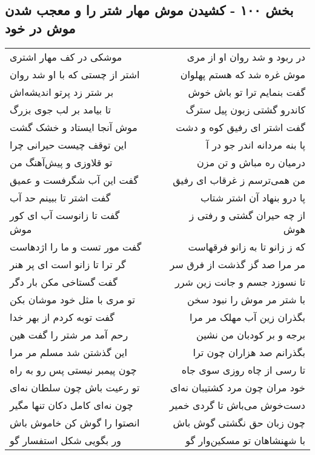 \begin{center}
\section*{بخش ۱۰۰ - کشیدن موش مهار شتر را و معجب  شدن موش در خود}
\label{sec:sh100}
\begin{longtable}{l p{0.5cm} r}
موشکی در کف مهار اشتری
&&
در ربود و شد روان او از مری
\\
اشتر از چستی که با او شد روان
&&
موش غره شد که هستم پهلوان
\\
بر شتر زد پرتو اندیشه‌اش
&&
گفت بنمایم ترا تو باش خوش
\\
تا بیامد بر لب جوی بزرگ
&&
کاندرو گشتی زبون پیل سترگ
\\
موش آنجا ایستاد و خشک گشت
&&
گفت اشتر ای رفیق کوه و دشت
\\
این توقف چیست حیرانی چرا
&&
پا بنه مردانه اندر جو در آ
\\
تو قلاوزی و پیش‌آهنگ من
&&
درمیان ره مباش و تن مزن
\\
گفت این آب شگرفست و عمیق
&&
من همی‌ترسم ز غرقاب ای رفیق
\\
گفت اشتر تا ببینم حد آب
&&
پا درو بنهاد آن اشتر شتاب
\\
گفت تا زانوست آب ای کور موش
&&
از چه حیران گشتی و رفتی ز هوش
\\
گفت مور تست و ما را اژدهاست
&&
که ز زانو تا به زانو فرقهاست
\\
گر ترا تا زانو است ای پر هنر
&&
مر مرا صد گز گذشت از فرق سر
\\
گفت گستاخی مکن بار دگر
&&
تا نسوزد جسم و جانت زین شرر
\\
تو مری با مثل خود موشان بکن
&&
با شتر مر موش را نبود سخن
\\
گفت توبه کردم از بهر خدا
&&
بگذران زین آب مهلک مر مرا
\\
رحم آمد مر شتر را گفت هین
&&
برجه و بر کودبان من نشین
\\
این گذشتن شد مسلم مر مرا
&&
بگذرانم صد هزاران چون ترا
\\
چون پیمبر نیستی پس رو به راه
&&
تا رسی از چاه روزی سوی جاه
\\
تو رعیت باش چون سلطان نه‌ای
&&
خود مران چون مرد کشتیبان نه‌ای
\\
چون نه‌ای کامل دکان تنها مگیر
&&
دست‌خوش می‌باش تا گردی خمیر
\\
انصتوا را گوش کن خاموش باش
&&
چون زبان حق نگشتی گوش باش
\\
ور بگویی شکل استفسار گو
&&
با شهنشاهان تو مسکین‌وار گو
\\

\end{longtable}
\end{center}
